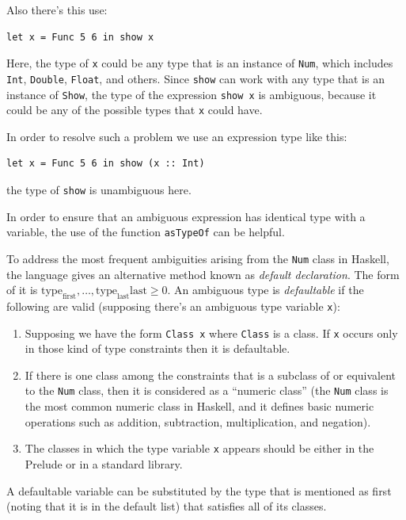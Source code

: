 \documentclass[a4paper, titlepage, twoside]{article}
\begin{document}
Also there’s this use:

\begin{verbatim}
let x = Func 5 6 in show x
\end{verbatim}

Here, the type of \texttt{x} could be any type that is an instance of \texttt{Num}, which includes \texttt{Int}, \texttt{Double}, \texttt{Float}, and others. Since \texttt{show} can work with any type that is an instance of \texttt{Show}, the type of the expression \texttt{show x} is ambiguous, because it could be any of the possible types that \texttt{x} could have.

In order to resolve such a problem we use an expression type like this:

\begin{verbatim}
let x = Func 5 6 in show (x :: Int)
\end{verbatim}

the type of \texttt{show} is unambiguous here.

In order to ensure that an ambiguous expression has identical type with a variable, the use of the
function \texttt{asTypeOf} can be helpful.

To address the most frequent ambiguities arising from the \texttt{Num} class in Haskell, the language gives an alternative method known as \emph{default declaration}. The form of it is \(\text{type}_{\text{first}}, \dots, \text{type}_{\text{last}} \text{last} \geq 0\). An ambiguous type is \emph{defaultable} if the following are valid (supposing there’s an ambiguous type variable \texttt{x}):

\begin{enumerate}
\item Supposing we have the form \texttt{Class x} where \texttt{Class} is a class. If \texttt{x} occurs only in those kind of type constraints then it is defaultable.
\item If there is one class among the constraints that is a subclass of or equivalent to the \texttt{Num} class, then it is considered as a ``numeric class'' (the \texttt{Num} class is the most common numeric class in Haskell, and it defines basic numeric operations such as addition, subtraction, multiplication, and negation).
\item The classes in which the type variable \texttt{x} appears should be either in the Prelude or in a standard library.
\end{enumerate}

A defaultable variable can be substituted by the type that is mentioned as first (noting that it is in the default list) that satisfies all of its classes.
\end{document}
